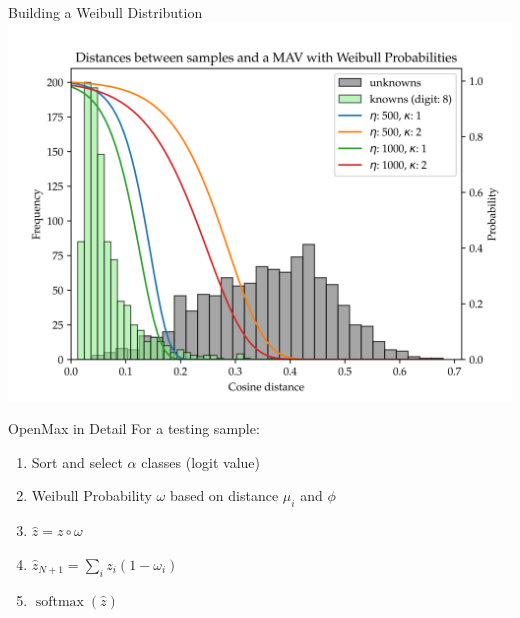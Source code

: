 
\begin{frame}{Building a Weibull Distribution}
	\centering
	\includegraphics[width=\textwidth]{figures/distances-to-mav.png}
\end{frame}

\begin{frame}{OpenMax in Detail}
	For a testing sample:
	\begin{enumerate}
		\item Sort and select $\alpha$ classes (logit value)
		\item Weibull Probability $\omega$ based on distance $\mu_i$ and $\phi$
		\item $\hat{z} = z \circ \omega $
		\item $\hat{z}_{N+1} = \sum_i z_i (1 - \omega_i)$
		\item $\operatorname{softmax}(\hat{z})$
	\end{enumerate}
\end{frame}


